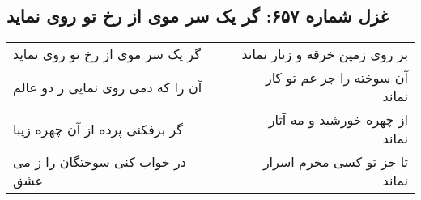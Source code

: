\begin{center}
\section*{غزل شماره ۶۵۷: گر یک سر موی از رخ تو روی نماید}
\label{sec:0657}
\begin{longtable}{l p{0.5cm} r}
گر یک سر موی از رخ تو روی نماید
&&
بر روی زمین خرقه و زنار نماند
\\
آن را که دمی روی نمایی ز دو عالم
&&
آن سوخته را جز غم تو کار نماند
\\
گر برفکنی پرده از آن چهره زیبا
&&
از چهره خورشید و مه آثار نماند
\\
در خواب کنی سوختگان را ز می عشق
&&
تا جز تو کسی محرم اسرار نماند
\\
\end{longtable}
\end{center}
